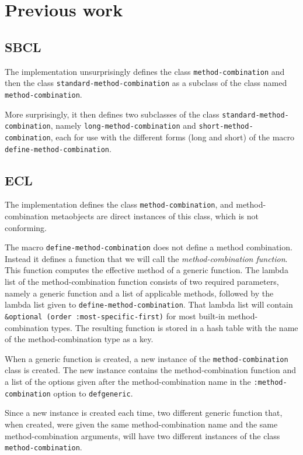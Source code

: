 \section{Previous work}

\subsection{SBCL}

The \sbcl{} \commonlisp{} implementation unsurprisingly defines the
class \texttt{method\--combination} and then the class
\texttt{standard\--method\--combination} as a subclass of
the class named \texttt{method\--combination}.

More surprisingly, it then defines two subclasses of the class
\texttt{standard\--method\--combination}, namely
\texttt{long\--method\--combination} and
\texttt{short\--method\--combination}, each for use with the different
forms (long and short) of the macro
\texttt{define\--method\--combination}.

\subsection{ECL}

The \ecl{} \commonlisp{} implementation defines the class
\texttt{method-combination}, and method-combination metaobjects are
direct instances of this class, which is not conforming.

The macro \texttt{define-method-combination} does not define a method
combination.  Instead it defines a function that we will call the
\emph{method-combination function}.  This function computes the
effective method of a generic function.  The lambda list of the
method-combination function consists of two required parameters,
namely a generic function and a list of applicable methods, followed
by the lambda list given to \texttt{define-method-combination}.  That
lambda list will contain \texttt{\&optional (order
  :most-specific-first)} for most built-in method-combination types.
The resulting function is stored in a hash table with the name of the
method-combination type as a key.

When a generic function is created, a new instance of the
\texttt{method-combination} class is created.  The new instance
contains the method-combination function and a list of the options
given after the method-combination name in the
\texttt{:method-combination} option to \texttt{defgeneric}.

Since a new instance is created each time, two different generic
function that, when created, were given the same method-combination
name and the same method-combination arguments, will have two
different instances of the class \texttt{method-combination}.
